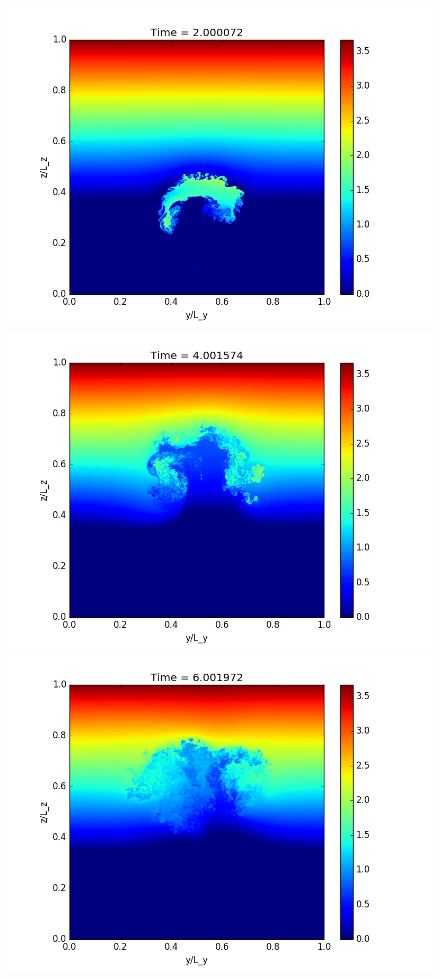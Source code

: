 \documentclass{article}
\begin{document}
\begin{figure}
  \includegraphics[scale=0.4]{pmpic_images/2.png}
  \includegraphics[scale=0.4]{pmpic_images/4.png}
  \includegraphics[scale=0.4]{pmpic_images/6.png}

\end{figure}
\end{document}
